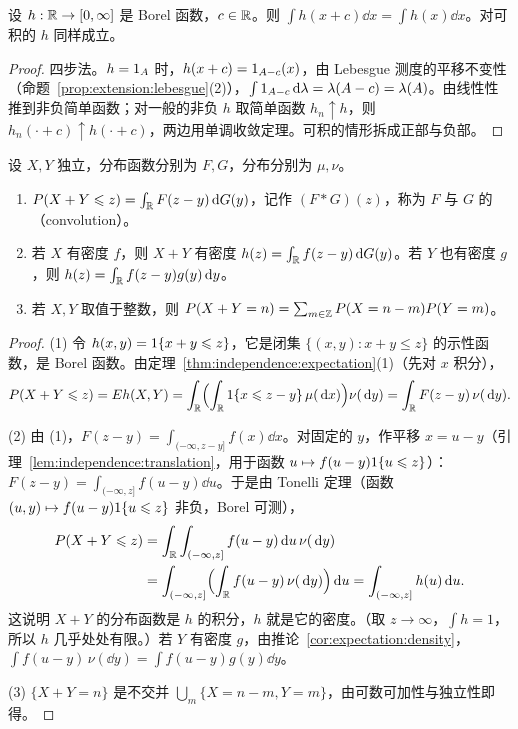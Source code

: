 \begin{lemma}[积分的平移不变性]\label{lem:independence:translation}
设 $h:\mathbb{R}\to[0,\infty]$ 是 Borel 函数，$c\in\mathbb{R}$。则 $\int h(x+c)\dd x=\int h(x)\dd x$。对可积的 $h$ 同样成立。
\end{lemma}
\begin{proof}
四步法。$h=1_A$ 时，$h(x+c)=1_{A-c}(x)$，由 Lebesgue 测度的平移不变性（命题~\ref{prop:extension:lebesgue}(2)），$\int1_{A-c}\,\mathrm{d}\lambda=\lambda(A-c)=\lambda(A)$。由线性性推到非负简单函数；对一般的非负 $h$ 取简单函数 $h_n\uparrow h$，则 $h_n(\cdot+c)\uparrow h(\cdot+c)$，两边用单调收敛定理。可积的情形拆成正部与负部。
\end{proof}

\begin{theorem}[卷积公式]\label{thm:independence:convolution}
设 $X,Y$ 独立，分布函数分别为 $F,G$，分布分别为 $\mu,\nu$。
\begin{enumerate}
\item $P(X+Y\leqslant z)=\int_{\mathbb{R}} F(z-y)\,\mathrm{d} G(y)$，记作 $(F*G)(z)$，称为 $F$ 与 $G$ 的（convolution）。
\item 若 $X$ 有密度 $f$，则 $X+Y$ 有密度 $h(z)=\int_{\mathbb{R}} f(z-y)\,\mathrm{d} G(y)$。若 $Y$ 也有密度 $g$，则 $h(z)=\int_{\mathbb{R}} f(z-y)g(y)\,\mathrm{d} y$。
\item 若 $X,Y$ 取值于整数，则 $P(X+Y=n)=\sum_{m\in\mathbb{Z}}P(X=n-m)P(Y=m)$。
\end{enumerate}
\end{theorem}
\begin{proof}
(1) 令 $h(x,y)=1\{x+y\leqslant z\}$，它是闭集 $\{(x,y):x+y\leqslant z\}$ 的示性函数，是 Borel 函数。由定理~\ref{thm:independence:expectation}(1)（先对 $x$ 积分），
\[
P(X+Y\leqslant z)=Eh(X,Y)=\int_{\mathbb{R}}\Bigl(\int_{\mathbb{R}}1\{x\leqslant z-y\}\,\mu(\,\mathrm{d} x)\Bigr)\nu(\,\mathrm{d} y)=\int_{\mathbb{R}} F(z-y)\,\nu(\,\mathrm{d} y).
\]

(2) 由 (1)，$F(z-y)=\int_{(-\infty,z-y]}f(x)\dd x$。对固定的 $y$，作平移 $x=u-y$（引理~\ref{lem:independence:translation}，用于函数 $u\mapsto f(u-y)1\{u\leqslant z\}$）：$F(z-y)=\int_{(-\infty,z]}f(u-y)\dd u$。于是由 Tonelli 定理（函数 $(u,y)\mapsto f(u-y)1\{u\leqslant z\}$ 非负，Borel 可测），
\[
\begin{aligned}
P(X+Y\leqslant z)&=\int_{\mathbb{R}}\int_{(-\infty,z]}f(u-y)\,\mathrm{d} u\,\nu(\,\mathrm{d} y)\\
&=\int_{(-\infty,z]}\Bigl(\int_{\mathbb{R}} f(u-y)\,\nu(\,\mathrm{d} y)\Bigr)\,\mathrm{d} u=\int_{(-\infty,z]}h(u)\,\mathrm{d} u .
\end{aligned}
\]
这说明 $X+Y$ 的分布函数是 $h$ 的积分，$h$ 就是它的密度。（取 $z\to\infty$，$\int h=1$，所以 $h$ 几乎处处有限。）若 $Y$ 有密度 $g$，由推论~\ref{cor:expectation:density}，$\int f(u-y)\,\nu(\dd y)=\int f(u-y)g(y)\dd y$。

(3) $\{X+Y=n\}$ 是不交并 $\bigcup_m\{X=n-m,Y=m\}$，由可数可加性与独立性即得。
\end{proof}

